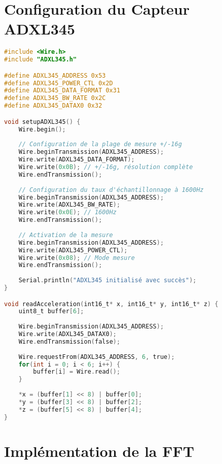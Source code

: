 
\section{Configuration du Capteur ADXL345}

\begin{lstlisting}[language=C, caption=Initialisation du capteur ADXL345]
#include <Wire.h>
#include "ADXL345.h"

#define ADXL345_ADDRESS 0x53
#define ADXL345_POWER_CTL 0x2D
#define ADXL345_DATA_FORMAT 0x31
#define ADXL345_BW_RATE 0x2C
#define ADXL345_DATAX0 0x32

void setupADXL345() {
    Wire.begin();
    
    // Configuration de la plage de mesure +/-16g
    Wire.beginTransmission(ADXL345_ADDRESS);
    Wire.write(ADXL345_DATA_FORMAT);
    Wire.write(0x0B); // +/-16g, résolution complète
    Wire.endTransmission();
    
    // Configuration du taux d'échantillonnage à 1600Hz
    Wire.beginTransmission(ADXL345_ADDRESS);
    Wire.write(ADXL345_BW_RATE);
    Wire.write(0x0E); // 1600Hz
    Wire.endTransmission();
    
    // Activation de la mesure
    Wire.beginTransmission(ADXL345_ADDRESS);
    Wire.write(ADXL345_POWER_CTL);
    Wire.write(0x08); // Mode mesure
    Wire.endTransmission();
    
    Serial.println("ADXL345 initialisé avec succès");
}

void readAcceleration(int16_t* x, int16_t* y, int16_t* z) {
    uint8_t buffer[6];
    
    Wire.beginTransmission(ADXL345_ADDRESS);
    Wire.write(ADXL345_DATAX0);
    Wire.endTransmission(false);
    
    Wire.requestFrom(ADXL345_ADDRESS, 6, true);
    for(int i = 0; i < 6; i++) {
        buffer[i] = Wire.read();
    }
    
    *x = (buffer[1] << 8) | buffer[0];
    *y = (buffer[3] << 8) | buffer[2];
    *z = (buffer[5] << 8) | buffer[4];
}
\end{lstlisting}

\section{Implémentation de la FFT}

